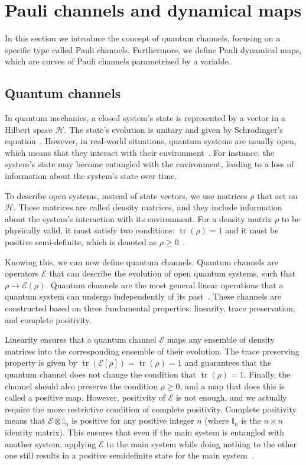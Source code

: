 \documentclass[10pt,letterpaper]{article} %
\DeclareMathOperator{\tr}{tr}
\begin{document}
\section{Pauli channels and dynamical maps}  \label{sec: Pauli Channels} %


In this section  we introduce the concept of quantum channels, focusing on a
specific type called Pauli channels.  Furthermore, we define Pauli dynamical
maps, which are curves of Pauli channels parametrized by a variable.
\subsection{Quantum channels} \label{subsec: Quantum Channels} %


In quantum mechanics, a closed system's state is represented by a vector in a
Hilbert space $\mathcal{H}$.  The state's evolution is unitary and given by
Schrodinger's equation~\cite{Rieffel}.  However, in real-world situations,
quantum systems are usually open, which means that they interact with their
environment~\cite{breuer2007theory}.  For instance, the system's state may become
entangled with the environment, leading to a loss of information about the
system's state over time.

To describe open systems, instead of state vectors, we use matrices $\rho$ that
act on $\mathcal{H}$.  These matrices are called density matrices, and they
include information about the system's interaction with its environment.  For a
density matrix $\rho$ to be physically valid, it must satisfy two conditions:
$\tr(\rho) = 1$ and it must be positive semi-definite, which is denoted as
$\rho \geq 0$~\cite{chuangbook}.


Knowing this, we can now define quantum channels.  Quantum channels are
operators $\mathcal{E}$ that can describe the evolution of open quantum
systems, such that $\rho \rightarrow \mathcal{E}(\rho)$.  Quantum channels are
the most general linear operations that a quantum system can undergo
independently of its past~\cite{zimansbook,cirac}.  These channels are
constructed based on three fundamental properties: linearity, trace
preservation, and complete positivity.

Linearity ensures that a quantum channel $\mathcal{E}$ maps any ensemble of
density matrices into the corresponding ensemble of their evolution.  The trace
preserving property is given by $\tr (\mathcal{E}[\rho]) = \tr (\rho) = 1$ and
guarantees that the quantum channel does not change the condition that
$\tr(\rho) = 1$.  Finally, the channel should also preserve the condition $\rho
\geq 0$, and a map that does this is called a positive map.  However,
positivity of $\mathcal{E}$ is not enough, and we actually require the more
restrictive condition of complete positivity.  Complete positivity means that
$\mathcal{E} \otimes \mathbb{I}_n$ is positive for any positive integer $n$
(where $\mathbb{I}_n$ is the $n\times n$ identity matrix).  This ensures that
even if the main system is entangled with another system, applying
$\mathcal{E}$ to the main system while doing nothing to the other one
still results in  a positive semidefinite state for the main
system~\cite{chuangbook}. 
\end{document}

